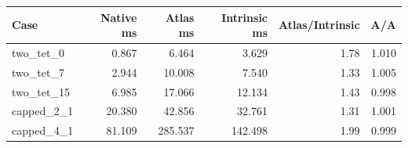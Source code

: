 \begin{tabular}{lrrrrr}
\toprule
Case & Native ms & Atlas ms & Intrinsic ms & Atlas/Intrinsic & A/A \\
\midrule
two\_tet\_0 & 0.867 & 6.464 & 3.629 & 1.78 & 1.010 \\
two\_tet\_7 & 2.944 & 10.008 & 7.540 & 1.33 & 1.005 \\
two\_tet\_15 & 6.985 & 17.066 & 12.134 & 1.43 & 0.998 \\
capped\_2\_1 & 20.380 & 42.856 & 32.761 & 1.31 & 1.001 \\
capped\_4\_1 & 81.109 & 285.537 & 142.498 & 1.99 & 0.999 \\
\bottomrule
\end{tabular}

